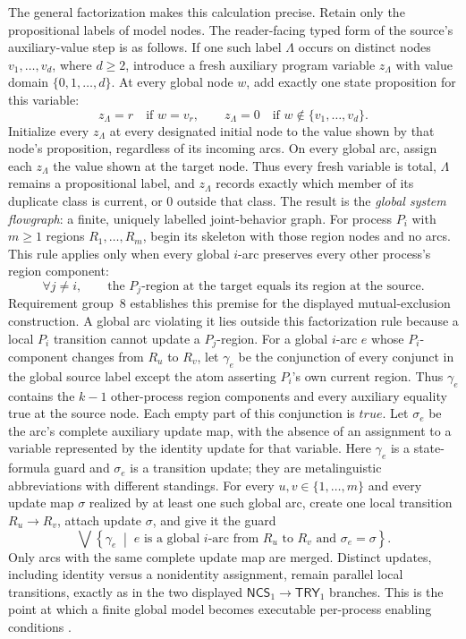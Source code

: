 The general factorization makes this calculation precise.  Retain only the
propositional labels of model nodes.  The reader-facing typed form of the
source's auxiliary-value step is as follows.  If one such label \(\Lambda\)
occurs on distinct nodes \(v_1,\ldots,v_d\), where \(d\geq2\), introduce a
fresh auxiliary program variable \(z_{\Lambda}\) with value domain
\(\{0,1,\ldots,d\}\).  At every global node \(w\), add exactly one state
proposition for this variable:
\[
 z_{\Lambda}=r\quad\text{if }w=v_r,
 \qquad
 z_{\Lambda}=0\quad\text{if }w\notin\{v_1,\ldots,v_d\}.
\]
Initialize every \(z_{\Lambda}\) at every designated initial node to the value
shown by that node's proposition, regardless of its incoming arcs.  On every
global arc, assign each \(z_{\Lambda}\) the value shown at the target node.
Thus every fresh variable is total, \(\Lambda\) remains a propositional label,
and \(z_{\Lambda}\) records exactly which member of its duplicate class is
current, or \(0\) outside that class.  The result is the \emph{global system
flowgraph}: a finite, uniquely labelled joint-behavior graph.  For process
\(P_i\) with \(m\geq1\) regions \(R_1,\ldots,R_m\), begin its
skeleton with those region nodes and no arcs.  This rule applies only when
every global \(i\)-arc preserves every other process's region component:
\[
 \forall j\ne i,\qquad
 \text{the \(P_j\)-region at the target equals its region at the source}.
\]
Requirement group~8 establishes this premise for the displayed
mutual-exclusion construction.  A global arc violating it lies outside this
factorization rule because a local \(P_i\) transition cannot update a
\(P_j\)-region.  For a global \(i\)-arc \(e\)
whose \(P_i\)-component changes from \(R_u\) to \(R_v\), let \(\gamma_e\) be
the conjunction of every conjunct in the global source label except the atom
asserting \(P_i\)'s own current region.  Thus \(\gamma_e\) contains the
\(k-1\) other-process region components and every auxiliary equality true
at the source node.  Each empty part of this conjunction is
\(\mathit{true}\).  Let \(\sigma_e\) be the arc's complete auxiliary update
map, with the absence of an assignment to a variable represented by the
identity update for that variable.  Here \(\gamma_e\) is a state-formula guard
and \(\sigma_e\) is a transition update; they are metalinguistic
abbreviations with different standings.
For every \(u,v\in\{1,\ldots,m\}\) and every update map \(\sigma\) realized
by at least one such global arc, create one local transition
\(R_u\to R_v\), attach update \(\sigma\), and give it the guard
\[
 \bigvee\left\{
   \gamma_e
   \;\middle|\;
   e\text{ is a global }i\text{-arc from }R_u\text{ to }R_v
   \text{ and }\sigma_e=\sigma
 \right\}.
\]
Only arcs with the same complete update map are merged.  Distinct updates,
including identity versus a nonidentity assignment, remain parallel local
transitions, exactly as in the two displayed
\(\mathsf{NCS}_1\to\mathsf{TRY}_1\) branches.  This is the point at which a
finite global model becomes executable per-process enabling conditions
\cite[pp.~68--70]{ClarkeEmerson1981}.


